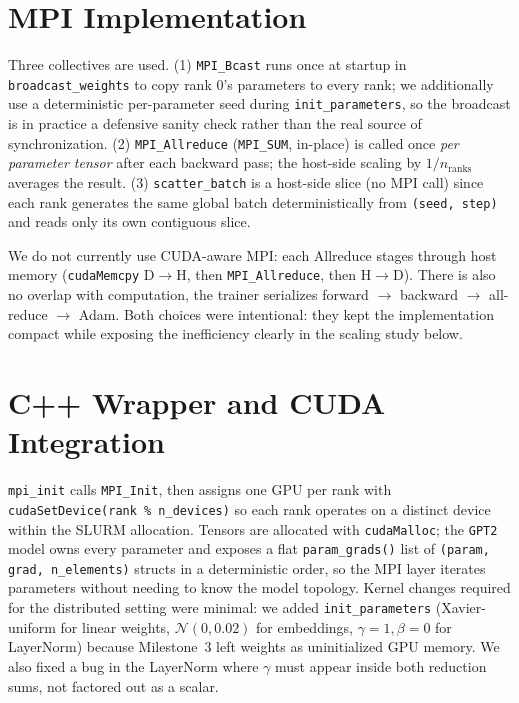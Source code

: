 \documentclass[11pt,letterpaper]{article}
\begin{document}
\section{MPI Implementation}

Three collectives are used. (1) \texttt{MPI\_Bcast} runs once at startup in \texttt{broadcast\_weights} to copy rank 0's parameters to every rank; we additionally use a deterministic per-parameter seed during \texttt{init\_parameters}, so the broadcast is in practice a defensive sanity check rather than the real source of synchronization. (2) \texttt{MPI\_Allreduce} (\texttt{MPI\_SUM}, in-place) is called once \emph{per parameter tensor} after each backward pass; the host-side scaling by $1/n_{\text{ranks}}$ averages the result. (3) \texttt{scatter\_batch} is a host-side slice (no MPI call) since each rank generates the same global batch deterministically from \texttt{(seed, step)} and reads only its own contiguous slice.

We do not currently use CUDA-aware MPI: each Allreduce stages through host memory (\texttt{cudaMemcpy} D$\to$H, then \texttt{MPI\_Allreduce}, then H$\to$D). There is also no overlap with computation, the trainer serializes forward $\to$ backward $\to$ all-reduce $\to$ Adam. Both choices were intentional: they kept the implementation compact while exposing the inefficiency clearly in the scaling study below.

\section{C++ Wrapper and CUDA Integration}

\texttt{mpi\_init} calls \texttt{MPI\_Init}, then assigns one GPU per rank with \texttt{cudaSetDevice(rank \% n\_devices)} so each rank operates on a distinct device within the SLURM allocation. Tensors are allocated with \texttt{cudaMalloc}; the \texttt{GPT2} model owns every parameter and exposes a flat \texttt{param\_grads()} list of \texttt{(param, grad, n\_elements)} structs in a deterministic order, so the MPI layer iterates parameters without needing to know the model topology. Kernel changes required for the distributed setting were minimal: we added \texttt{init\_parameters} (Xavier-uniform for linear weights, $\mathcal{N}(0,0.02)$ for embeddings, $\gamma{=}1,\beta{=}0$ for LayerNorm) because Milestone~3 left weights as uninitialized GPU memory. We also fixed a bug in the LayerNorm where $\gamma$ must appear inside both reduction sums, not factored out as a scalar.
\end{document}

